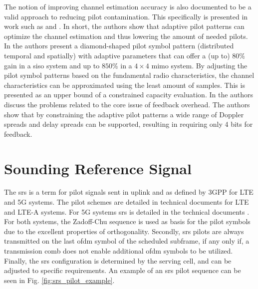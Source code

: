 The notion of improving channel estimation accuracy is also documented to be a valid approach to reducing pilot contamination. This specifically is presented in work such as \cite{Simko2013AdaptiveSystems} and \cite{Simko2013DesignPatterns}. In short, the authors show that adaptive pilot patterns can optimize the channel estimation and thus lowering the amount of needed pilots. In \cite{Simko2013AdaptiveSystems} the authors present a diamond-shaped pilot symbol pattern (distributed temporal and spatially) with adaptive parameters that can offer a (up to) $80\%$ gain in a \gls{siso} system and up to $850\%$ in a $4 \times 4$ \gls{mimo} system. By adjusting the pilot symbol patterns based on the fundamental radio characteristics, the channel characteristics can be approximated using the least amount of samples. This is presented as an upper bound of a constrained capacity evaluation. In \cite{Simko2013DesignPatterns} the authors discuss the problems related to the core issue of feedback overhead. The authors show that by constraining the adaptive pilot patterns a wide range of Doppler spreads and delay spreads can be supported, resulting in requiring only 4 bits for feedback. 





\section{Sounding Reference Signal}\label{sec:srs_sequence_definition}

The \gls{srs} is a term for pilot signals sent in uplink and as defined by 3GPP for LTE and 5G systems. The pilot schemes are detailed in technical documents \cite{36211, 3GPP2020TS15} for LTE and LTE-A systems. For 5G systems \gls{srs} is detailed in the technical documents \cite{38211, 3GPP2020TS15b}. For both systems, the Zadoff-Chu sequence is used as basis for the pilot symbols due to the excellent properties of orthogonality. Secondly, \gls{srs} pilots are always transmitted on the last \gls{ofdm} symbol of the scheduled subframe, if any only if, a transmission comb does not enable additional \gls{ofdm} symbols to be utilized. Finally, the \gls{srs} configuration is determined by the serving cell, and can be adjusted to specific requirements. An example of an \gls{srs} pilot sequence can be seen in Fig. \ref{fig:srs_pilot_example}.

